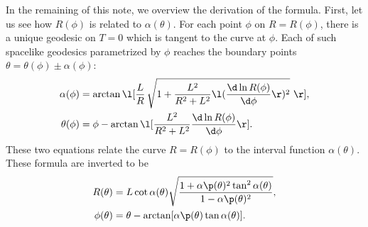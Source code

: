 \documentclass[12pt]{article}
\begin{document}
In the remaining of this note, we overview the derivation of the formula.
First, let us see how $R(\phi)$ is related to $\alpha(\theta)$.
For each point $\phi$ on $R=R(\phi)$, there is a unique geodesic on $T=0$ which is tangent to the curve at $\phi$.
Each of such spacelike geodesics parametrized by $\phi$ reaches the boundary points $\theta = \theta(\phi) \pm \alpha(\phi)$:
\begin{align}
	\alpha(\phi) &= \arctan\l[\frac{L}{R}\,\sqrt{1 + \frac{L^2}{R^2+L^2}\l(\frac{\d \ln R(\phi)}{\d\phi} \r)^2} \,\,\r],\\
	\theta(\phi) &= \phi - \arctan\l[\frac{L^2}{R^2 + L^2}\frac{\d\ln R(\phi)}{\d \phi} \r].
\end{align}
These two equations relate the curve $R=R(\phi)$ to the interval function $\alpha(\theta)$.
These formula are inverted to be
\begin{align}
	R(\theta) &= L\cot\alpha(\theta) \sqrt{\frac{1 + \alpha\p(\theta)^2\tan^2\alpha(\theta)}{1-\alpha\p(\theta)^2}},\label{eq:R}\\
	\phi(\theta) &= \theta - \arctan[\alpha\p(\theta)\tan\alpha(\theta)].\label{eq:phi}
\end{align}
\end{document}
